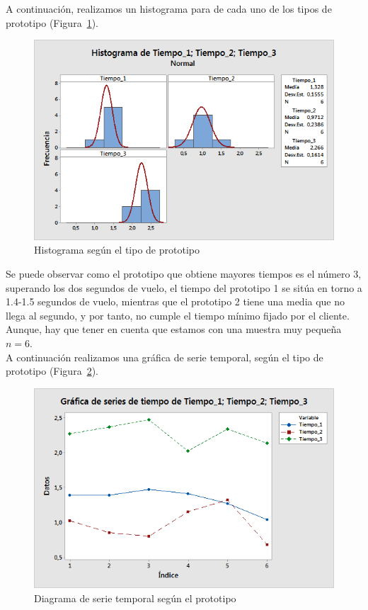 \documentclass[12pt,a4paper,twoside,openright,titlepage,final]{article}
\begin{document}
A continuación, realizamos un histograma para de cada uno de los tipos de prototipo (Figura~\ref{fig:histograma}).

\begin{figure}[htbp!]
	\centering
	\includegraphics[width=0.7\linewidth]{imagenes/Histograma_de_Tiempo_1_Tiempo_2_Tiempo_3_(por_prototipo)}
	\caption{Histograma según el tipo de prototipo}
	\label{fig:histograma}
\end{figure}

Se puede observar como el prototipo que obtiene mayores tiempos es el número 3, superando los dos segundos de vuelo, el tiempo del prototipo 1 se sitúa en torno a 1.4-1.5 segundos de vuelo, mientras que el prototipo 2 tiene una media que no llega al segundo, y por tanto, no cumple el tiempo mínimo fijado por el cliente. Aunque, hay que tener en cuenta que estamos con una muestra muy pequeña $n=6$.\\

A continuación realizamos una gráfica de serie temporal, según el tipo de prototipo (Figura~\ref{fig:temporal}).\\

\begin{figure}[htbp!]
	\centering
	\includegraphics[width=0.7\linewidth]{imagenes/Grafica_de_series_de_tiempo_de_Tiempo_1;_Tiempo_2;_Tiempo_3}
	\caption{Diagrama de serie temporal según el prototipo}
	\label{fig:temporal}
\end{figure}
\end{document}
